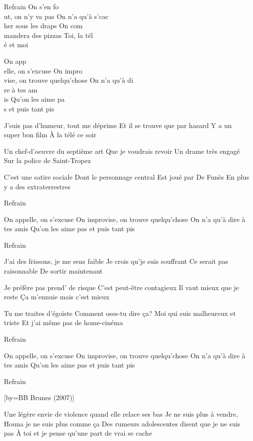 \beginverse
Refrain
On s'en fo\\[Do]ut, on n'y va pas
On n'a qu'à s'cac\\[Mim]her sous les draps
On com\\[Lam]mandera des pizzas
Toi, la tél\\[Sol]é et moi
\endverse

\beginverse
On app\\[Do]elle, on s'excuse
On impro\\[Mim]vise, on trouve quelqu'chose
On n'a qu'à di\\[Do]re à tes am\\[Mi]is
Qu'on les aime pa\\[Lam]s et puis tant pis
\endverse

\beginverse
J'suis pas d'humeur, tout me déprime
Et il se trouve que par hasard
Y a un super bon film
À la télé ce soir
\endverse

\beginverse
Un chef-d'oeuvre du septième art
Que je voudrais revoir
Un drame très engagé
Sur la police de Saint-Tropez
\endverse

\beginverse
C'est une satire sociale
Dont le personnage central
Est joué par De Funès
En plus y a des extraterrestres
\endverse

\beginverse
Refrain
\endverse

\beginverse
On appelle, on s'excuse
On improvise, on trouve quelqu'chose
On n'a qu'à dire à tes amis
Qu'on les aime pas et puis tant pis
\endverse

\beginverse
Refrain
\endverse

\beginverse
J'ai des frissons, je me sens faible
Je crois qu'je suis souffrant
Ce serait pas raisonnable
De sortir maintenant
\endverse

\beginverse
Je préfère pas prend' de risque
C'est peut-être contagieux
Il vaut mieux que je reste
Ça m'ennuie mais c'est mieux
\endverse

\beginverse
Tu me traites d'égoïste
Comment oses-tu dire ça?
Moi qui suis malheureux et triste
Et j'ai même pas de home-cinéma
\endverse

\beginverse
Refrain
\endverse

\beginverse
On appelle, on s'excuse
On improvise, on trouve quelqu'chose
On n'a qu'à dire à tes amis
Qu'on les aime pas et puis tant pis
\endverse

\beginverse
Refrain
\endverse

[by={BB Brunes (2007)}]

\beginverse
Une légère envie de violence quand elle relace ses bas
Je ne suis plus à vendre, Houna je ne suis plus comme ça
Des rumeurs adolescentes disent que je ne suis pas
À toi et je pense qu'une part de vrai se cache
\endverse

